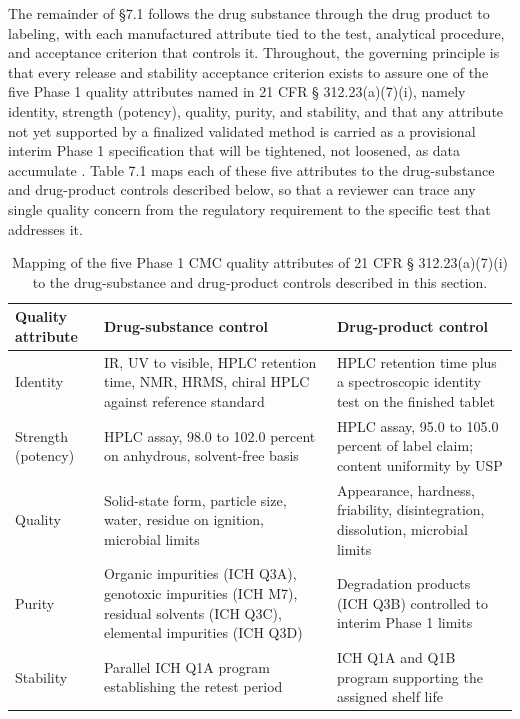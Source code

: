 The remainder of \S 7.1 follows the drug substance through the drug product to
labeling, with each manufactured attribute tied to the test, analytical
procedure, and acceptance criterion that controls it. Throughout, the governing
principle is that every release and stability acceptance criterion exists to
assure one of the five Phase 1 quality attributes named in 21 CFR \S
312.23(a)(7)(i), namely identity, strength (potency), quality, purity, and
stability, and that any attribute not yet supported by a finalized validated
method is carried as a provisional interim Phase 1 specification that will be
tightened, not loosened, as data accumulate \cite{phase1guidance}. Table 7.1
maps each of these five attributes to the drug-substance and drug-product
controls described below, so that a reviewer can trace any single quality concern
from the regulatory requirement to the specific test that addresses it.

\begin{table}[t]
\centering
\caption{Mapping of the five Phase 1 CMC quality attributes of 21 CFR \S
312.23(a)(7)(i) to the drug-substance and drug-product controls described in this
section.}
\label{tab:cmc-attribute-map}
\begin{tabularx}{\textwidth}{L{3.0cm} L{5.5cm} Y}
\toprule
\textbf{Quality attribute} & \textbf{Drug-substance control} & \textbf{Drug-product control} \\
\midrule
Identity & IR, UV to visible, HPLC retention time, NMR, HRMS, chiral HPLC against reference standard & HPLC retention time plus a spectroscopic identity test on the finished tablet \\
Strength (potency) & HPLC assay, 98.0 to 102.0 percent on anhydrous, solvent-free basis & HPLC assay, 95.0 to 105.0 percent of label claim; content uniformity by USP \\
Quality & Solid-state form, particle size, water, residue on ignition, microbial limits & Appearance, hardness, friability, disintegration, dissolution, microbial limits \\
Purity & Organic impurities (ICH Q3A), genotoxic impurities (ICH M7), residual solvents (ICH Q3C), elemental impurities (ICH Q3D) & Degradation products (ICH Q3B) controlled to interim Phase 1 limits \\
Stability & Parallel ICH Q1A program establishing the retest period & ICH Q1A and Q1B program supporting the assigned shelf life \\
\bottomrule
\end{tabularx}
\vspace*{-0.2cm}
\end{table}

